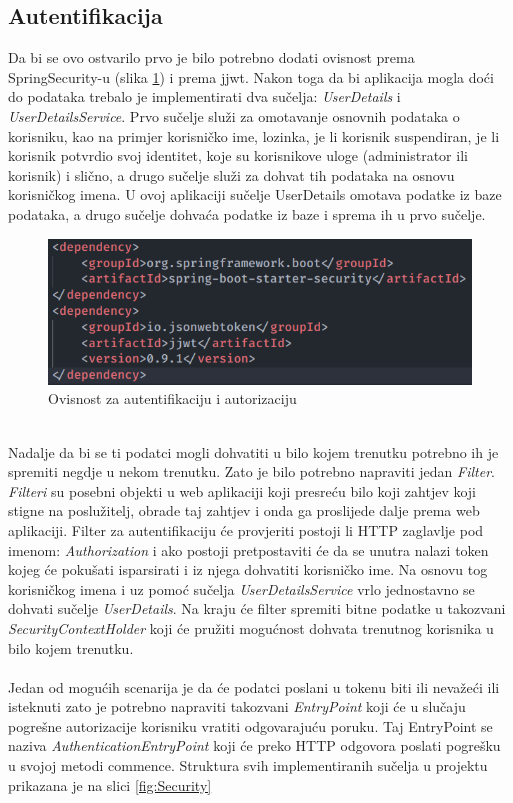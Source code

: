 \documentclass[times, utf8, zavrsni]{fer}
\begin{document}
\subsection{Autentifikacija}
Da bi se ovo ostvarilo prvo je bilo potrebno dodati ovisnost prema \linebreak
SpringSecurity-u (slika \ref{fig:Security dependency}) i prema jjwt. Nakon toga da bi aplikacija mogla doći do podataka trebalo je implementirati dva sučelja:
\textit{UserDetails} i \textit{UserDetailsService}. Prvo sučelje služi za omotavanje osnovnih podataka o korisniku,
kao na primjer korisničko ime, lozinka, je li korisnik suspendiran, je li korisnik potvrdio svoj identitet,
koje su korisnikove uloge (administrator ili korisnik) i slično,
a drugo sučelje služi za dohvat tih podataka na osnovu korisničkog imena. U ovoj aplikaciji sučelje UserDetails omotava
podatke iz baze podataka, a drugo sučelje dohvaća podatke iz baze i sprema ih u prvo sučelje.
\begin{figure}[h]
      \centering
      \includegraphics[width=.5\textwidth]{security_dependency.png}
      \caption{Ovisnost za autentifikaciju i autorizaciju}
      \label{fig:Security dependency}
\end{figure}
\\
Nadalje da bi se ti podatci mogli dohvatiti u bilo kojem trenutku potrebno ih je spremiti negdje u nekom trenutku.
Zato je bilo potrebno napraviti jedan \textit{Filter}. \textit{Filteri} su posebni objekti u web aplikaciji koji presreću bilo koji
zahtjev koji stigne na poslužitelj, obrade taj zahtjev i onda ga proslijede dalje prema web aplikaciji.
Filter za autentifikaciju će provjeriti postoji li HTTP zaglavlje pod imenom: \textit{Authorization} i ako
postoji pretpostaviti će da se unutra nalazi token kojeg će pokušati isparsirati i iz njega dohvatiti korisničko ime.
Na osnovu tog korisničkog imena i uz pomoć sučelja \textit{UserDetailsService} vrlo jednostavno se dohvati sučelje \textit{UserDetails}.
Na kraju će filter spremiti bitne podatke u takozvani \textit{SecurityContextHolder} koji će pružiti mogućnost dohvata trenutnog
korisnika u bilo kojem trenutku.
\\\\
Jedan od mogućih scenarija je da će podatci poslani u tokenu biti ili nevažeći ili isteknuti zato je potrebno napraviti
takozvani \textit{EntryPoint} koji će u slučaju pogrešne autorizacije korisniku vratiti odgovarajuću poruku. Taj EntryPoint
se naziva \textit{AuthenticationEntryPoint} koji će preko HTTP odgovora poslati pogrešku u svojoj metodi commence. Struktura
svih implementiranih sučelja u projektu prikazana je na slici \ref{fig:Security}
\end{document}
